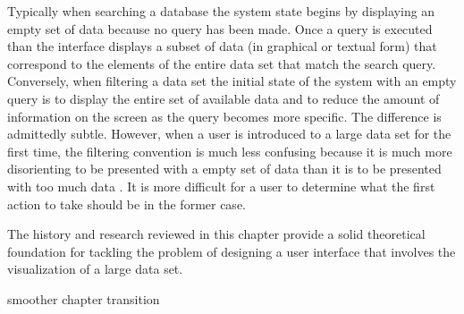 Typically when searching a database the system state begins by displaying an empty set of data because no query has been made. Once a query is executed than the interface displays a subset of data (in graphical or textual form) that correspond to the elements of the entire data set that match the search query. Conversely, when filtering a data set the initial state of the system with an empty query is to display the entire set of available data and to reduce the amount of information on the screen as the query becomes more specific. The difference is admittedly subtle. However, when a user is introduced to a large data set for the first time, the filtering convention is much less confusing because it is much more disorienting to be presented with a empty set of data than it is to be presented with too much data \cite{seeking1994}. It is more difficult for a user to determine what the first action to take should be in the former case.

The history and research reviewed in this chapter provide a solid theoretical foundation for tackling the problem of designing a user interface that involves the visualization of a large data set.

smoother chapter transition
